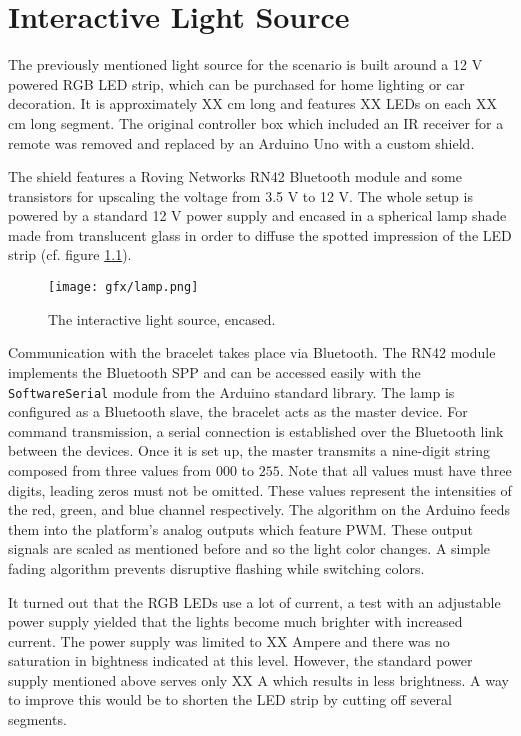 \chapter{Interactive Light Source}

The previously mentioned light source for the scenario is built around a 12 V powered RGB \ac{LED} strip, which can be purchased for home lighting or car decoration. It is approximately XX cm long and features XX \ac{LED}s on each XX cm long segment. The original controller box which included an \ac{IR} receiver for a remote was removed and replaced by an Arduino Uno \cite{arduino_uno} with a custom shield. 

The shield features a Roving Networks RN42 Bluetooth module \cite{datasheet_rn42} and some transistors for upscaling the voltage from 3.5 V to 12 V. The whole setup is powered by a standard 12 V power supply and encased in a spherical lamp shade made from translucent glass in order to diffuse the spotted impression of the LED strip (cf. figure \ref{fig:lamp}).

\begin{figure}[bth]
	\begin{center}
		\texttt{[image: gfx/lamp.png]}
	\end{center}
	\label{fig:lamp}
	\caption{The interactive light source, encased.}
\end{figure} 

Communication with the bracelet takes place via Bluetooth. The RN42 module implements the Bluetooth \ac{SPP} and can be accessed easily with the \texttt{SoftwareSerial} module from the Arduino standard library. The lamp is configured as a Bluetooth slave, the bracelet acts as the master device. For command transmission, a serial connection is established over the Bluetooth link between the devices. Once it is set up, the master transmits a nine-digit string composed from three values from $000$ to $255$. Note that all values must have three digits, leading zeros must not be omitted. These values represent the intensities of the red, green, and blue channel respectively. The algorithm on the Arduino feeds them into the platform's analog outputs which feature \ac{PWM}. These output signals are scaled as mentioned before and so the light color changes. A simple fading algorithm prevents disruptive flashing while switching colors.

It turned out that the RGB \ac{LED}s use a lot of current, a test with an adjustable power supply yielded that the lights become much brighter with increased current. The power supply was limited to XX Ampere and there was no saturation in bightness indicated at this level. However, the standard power supply mentioned above serves only XX A which results in less brightness. A way to improve this would be to shorten the \ac{LED} strip by cutting off several segments.